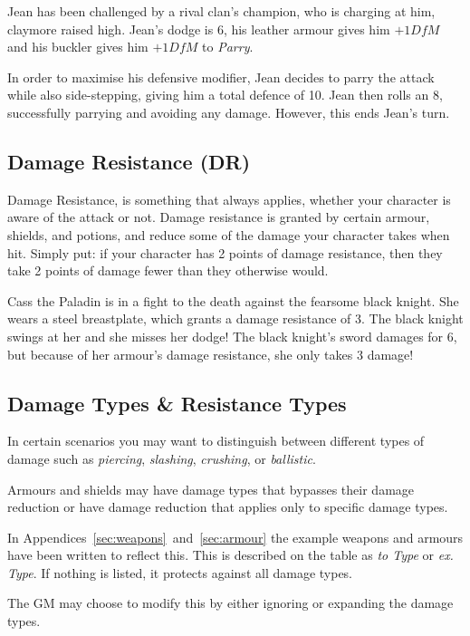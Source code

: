 \example Jean has been challenged by a rival clan's champion, who is charging at him, claymore raised high.
Jean's dodge is 6, his leather armour gives him $+1 \mathit{DfM}$ and his buckler gives him $+1 \mathit{DfM}$ to \textit{Parry}.

In order to maximise his defensive modifier, Jean decides to parry the attack while also side-stepping, giving him a total defence of 10.
Jean then rolls an 8, successfully parrying and avoiding any damage.
However, this ends Jean's turn.

\subsection{Damage Resistance (DR)}\label{sec:damage-resistance}
Damage Resistance, is something that always applies, whether your character is aware of the attack or not.
Damage resistance is granted by certain armour, shields, and potions, and reduce some of the damage your character takes when hit.
Simply put: if your character has 2 points of damage resistance, then they take 2 points of damage fewer than they otherwise would.

\example Cass the Paladin is in a fight to the death against the fearsome black knight.
She wears a steel breastplate, which grants a damage resistance of 3.
The black knight swings at her and she misses her dodge!
The black knight's sword damages for 6, but because of her armour's damage resistance, she only takes 3 damage!

\subsection{Damage Types \& Resistance Types}
In certain scenarios you may want to distinguish between different types of damage such as \textit{piercing}, \textit{slashing}, \textit{crushing}, or \textit{ballistic}.

Armours and shields may have damage types that bypasses their damage reduction or have damage reduction that applies only to specific damage types.

In Appendices~\ref{sec:weapons}~and~\ref{sec:armour} the example weapons and armours have been written to reflect this.
This is described on the table as \textit{to Type} or \textit{ex. Type}.
If nothing is listed, it protects against all damage types.

The GM may choose to modify this by either ignoring or expanding the damage types.